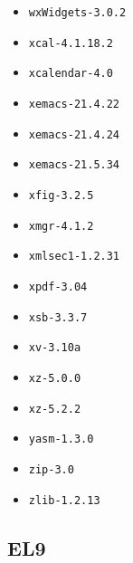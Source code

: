 \begin{multicols}{3}
\begin{itemize}
\item \verb|wxWidgets-3.0.2|
\item \verb|xcal-4.1.18.2|
\item \verb|xcalendar-4.0|
\item \verb|xemacs-21.4.22|
\item \verb|xemacs-21.4.24|
\item \verb|xemacs-21.5.34|
\item \verb|xfig-3.2.5|
\item \verb|xmgr-4.1.2|
\item \verb|xmlsec1-1.2.31|
\item \verb|xpdf-3.04|
\item \verb|xsb-3.3.7|
\item \verb|xv-3.10a|
\item \verb|xz-5.0.0|
\item \verb|xz-5.2.2|
\item \verb|yasm-1.3.0|
\item \verb|zip-3.0|
\item \verb|zlib-1.2.13|
\end{itemize}
\end{multicols}
\normalsize

\subsection{EL9}
\label{sect:software-el9}

